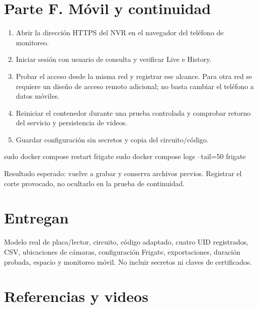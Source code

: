 \documentclass[12pt,a4paper]{article}
\begin{document}
\section*{Parte F. Móvil y continuidad}
\begin{enumerate}
\item Abrir la dirección HTTPS del NVR en el navegador del teléfono de monitoreo.
\item Iniciar sesión con usuario de consulta y verificar Live e History.
\item Probar el acceso desde la misma red y registrar ese alcance. Para otra red se requiere un diseño de acceso remoto adicional; no basta cambiar el teléfono a datos móviles.
\item Reiniciar el contenedor durante una prueba controlada y comprobar retorno del servicio y persistencia de videos.
\item Guardar configuración sin secretos y copia del circuito/código.
\end{enumerate}
\begin{Comandos}
sudo docker compose restart frigate
sudo docker compose logs --tail=50 frigate
\end{Comandos}
Resultado esperado: vuelve a grabar y conserva archivos previos. Registrar el corte provocado, no ocultarlo en la prueba de continuidad.\par
{}\section*{Entregan}
Modelo real de placa/lector, circuito, código adaptado, cuatro UID registrados, CSV, ubicaciones de cámaras, configuración Frigate, exportaciones, duración probada, espacio y monitoreo móvil. No incluir secretos ni claves de certificados.\par
{}\section*{Referencias y videos}
\end{document}
